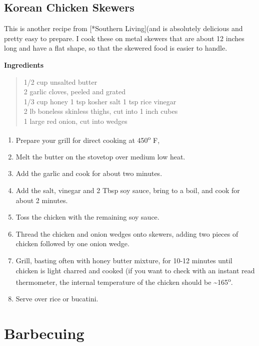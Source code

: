 \documentclass[
]{book}
\providecommand{\tightlist}{%
  \setlength{\itemsep}{0pt}\setlength{\parskip}{0pt}}
\begin{document}
\hypertarget{korean-chicken-skewers}{%
\subsection{Korean Chicken Skewers}\label{korean-chicken-skewers}}

This is another recipe from {[}*Southern Living{]}(and is absolutely delicious and pretty easy to prepare. I cook these on metal skewers that are about 12 inches long and have a flat shape, so that the skewered food is easier to handle.

\textbf{Ingredients}

\begin{quote}
1/2 cup unsalted butter\\
2 garlic cloves, peeled and grated\\
1/3 cup honey
1 tsp kosher salt
1 tsp rice vinegar\\
2 lb boneless skinless thighs, cut into 1 inch cubes\\
1 large red onion, cut into wedges
\end{quote}

\begin{enumerate}
\def\labelenumi{\arabic{enumi}.}
\tightlist
\item
  Prepare your grill for direct cooking at 450\textsuperscript{o} F,
\item
  Melt the butter on the stovetop over medium low heat.\\
\item
  Add the garlic and cook for about two minutes.
\item
  Add the salt, vinegar and 2 Tbsp soy sauce, bring to a boil, and cook for about 2 minutes.\\
\item
  Toss the chicken with the remaining soy sauce.
\item
  Thread the chicken and onion wedges onto skewers, adding two pieces of chicken followed by one onion wedge.
\item
  Grill, basting often with honey butter mixture, for 10-12 minutes until chicken is light charred and cooked (if you want to check with an instant read thermometer, the internal temperature of the chicken should be \textasciitilde165\textsuperscript{o}.
\item
  Serve over rice or bucatini.
\end{enumerate}

\hypertarget{bbq}{%
\section{Barbecuing}\label{bbq}}
\end{document}
